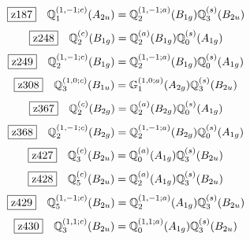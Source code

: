 \documentclass[fleqn,10pt,landscape]{jsarticle}
\begin{document}
\begin{dmath*}
\hspace*{3mm}\fbox{z187}\quad \mathbb{Q}_{1}^{(1,-1;c)}(A_{2u})=\mathbb{Q}_{2}^{(1,-1;a)}(B_{1g}) \mathbb{Q}_{3}^{(s)}(B_{2u})
\end{dmath*}
\begin{dmath*}
\hspace*{3mm}\fbox{z248}\quad \mathbb{Q}_{2}^{(c)}(B_{1g})=\mathbb{Q}_{2}^{(a)}(B_{1g}) \mathbb{Q}_{0}^{(s)}(A_{1g})
\end{dmath*}
\begin{dmath*}
\hspace*{3mm}\fbox{z249}\quad \mathbb{Q}_{2}^{(1,-1;c)}(B_{1g})=\mathbb{Q}_{2}^{(1,-1;a)}(B_{1g}) \mathbb{Q}_{0}^{(s)}(A_{1g})
\end{dmath*}
\begin{dmath*}
\hspace*{3mm}\fbox{z308}\quad \mathbb{Q}_{3}^{(1,0;c)}(B_{1u})=\mathbb{G}_{1}^{(1,0;a)}(A_{2g}) \mathbb{Q}_{3}^{(s)}(B_{2u})
\end{dmath*}
\begin{dmath*}
\hspace*{3mm}\fbox{z367}\quad \mathbb{Q}_{2}^{(c)}(B_{2g})=\mathbb{Q}_{2}^{(a)}(B_{2g}) \mathbb{Q}_{0}^{(s)}(A_{1g})
\end{dmath*}
\begin{dmath*}
\hspace*{3mm}\fbox{z368}\quad \mathbb{Q}_{2}^{(1,-1;c)}(B_{2g})=\mathbb{Q}_{2}^{(1,-1;a)}(B_{2g}) \mathbb{Q}_{0}^{(s)}(A_{1g})
\end{dmath*}
\begin{dmath*}
\hspace*{3mm}\fbox{z427}\quad \mathbb{Q}_{3}^{(c)}(B_{2u})=\mathbb{Q}_{0}^{(a)}(A_{1g}) \mathbb{Q}_{3}^{(s)}(B_{2u})
\end{dmath*}
\begin{dmath*}
\hspace*{3mm}\fbox{z428}\quad \mathbb{Q}_{5}^{(c)}(B_{2u})=\mathbb{Q}_{2}^{(a)}(A_{1g}) \mathbb{Q}_{3}^{(s)}(B_{2u})
\end{dmath*}
\begin{dmath*}
\hspace*{3mm}\fbox{z429}\quad \mathbb{Q}_{5}^{(1,-1;c)}(B_{2u})=\mathbb{Q}_{2}^{(1,-1;a)}(A_{1g}) \mathbb{Q}_{3}^{(s)}(B_{2u})
\end{dmath*}
\begin{dmath*}
\hspace*{3mm}\fbox{z430}\quad \mathbb{Q}_{3}^{(1,1;c)}(B_{2u})=\mathbb{Q}_{0}^{(1,1;a)}(A_{1g}) \mathbb{Q}_{3}^{(s)}(B_{2u})
\end{dmath*}
\end{document}
